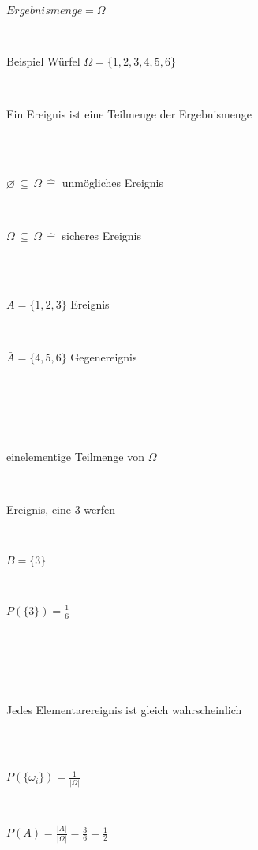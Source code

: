 \documentclass[10pt,a4paper,landscape]{article}
\begin{document}
\begin{multicols*}{4}
\subsection{}
\\ \\
\parbox{\columnwidth}{\centering$Ergebnismenge = \Omega$}\\
\parbox{\columnwidth}{\centering Beispiel Würfel $\Omega = \{ 1, 2, 3, 4, 5, 6 \}$}\\
\parbox{\columnwidth}{\centering Ein Ereignis ist eine Teilmenge der Ergebnismenge}\\\\
\parbox{\columnwidth}{\centering$\varnothing \, \subseteq \, \Omega \, \widehat{=}$ unmögliches Ereignis}\\
\parbox{\columnwidth}{\centering$\Omega \, \subseteq \, \Omega \, \widehat{=}$ sicheres Ereignis}\\\\
\parbox{\columnwidth}{\centering$A = \{1, 2, 3 \}$ Ereignis}\\
\parbox{\columnwidth}{\centering$\bar{A} = \{4, 5, 6 \}$ Gegenereignis}\\ \\
\\ \\
\parbox{\columnwidth}{\centering einelementige Teilmenge von $\Omega$}\\
\parbox{\columnwidth}{\centering Ereignis, eine 3 werfen}\\
\parbox{\columnwidth}{\centering $B = \{ 3 \}$}\\
\parbox{\columnwidth}{\centering $P(\{3\}) = \frac{1}{6}$}\\ \\
\\ \\
\parbox{\columnwidth}{\centering Jedes Elementarereignis ist gleich wahrscheinlich}\\\\
\parbox{\columnwidth}{\centering $P(\{\omega_i\}) = \frac{1}{\vert \Omega \vert}$}\\
\parbox{\columnwidth}{\centering $P(A) = \frac{\vert A \vert}{\vert \Omega \vert} = \frac{3}{6} = \frac{1}{2}$}\\


\end{multicols*}
\end{document}
